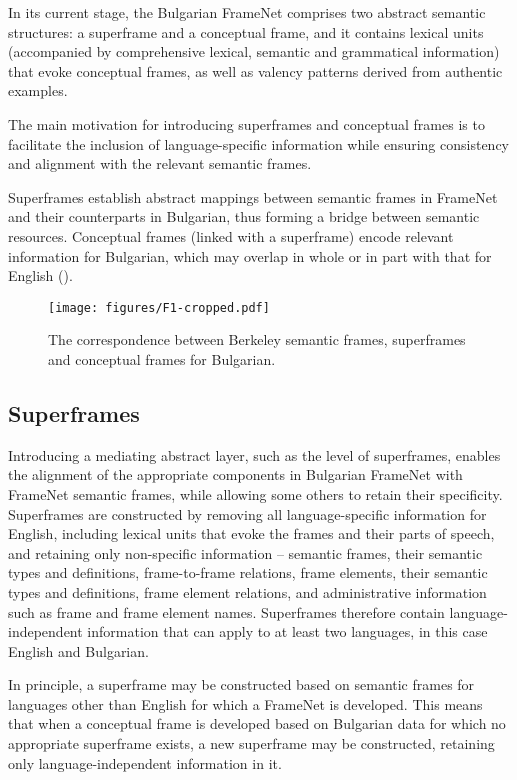 \documentclass[output=paper,colorlinks,citecolor=brown]{langscibook}
\begin{document}
In its current stage, the Bulgarian FrameNet comprises two abstract semantic structures: a superframe and a conceptual frame, and it contains lexical units (accompanied by comprehensive lexical, semantic and grammatical information) that evoke conceptual frames, as well as valency patterns derived from authentic examples.

The main motivation for introducing superframes and conceptual frames is to facilitate the inclusion of language-specific information while ensuring consistency and  alignment with the relevant semantic frames.

Superframes establish abstract mappings between semantic frames in FrameNet and their counterparts in Bulgarian, thus forming a bridge between semantic resources. Conceptual frames (linked with a superframe) encode relevant information for Bulgarian, which may overlap in whole or in part with that for English ().
\largerpage
\begin{figure}
 \texttt{[image: figures/F1-cropped.pdf]}
 \caption{The correspondence between Berkeley semantic frames, superframes and conceptual frames for Bulgarian.}
  \label{fig:frames}
\end{figure}

\subsection{Superframes}  
  

Introducing a mediating abstract layer, such as the level of superframes, enables the alignment of the appropriate components in Bulgarian FrameNet with FrameNet semantic frames, while allowing some others to retain their specificity. Superframes are constructed by removing all language-specific information for English, including lexical units that evoke the frames and their parts of speech, and retaining only non-specific information -- semantic frames, their semantic types and definitions, frame-to-frame relations, frame elements, their semantic types and definitions, frame element relations, and administrative information such as frame and frame element names. Superframes therefore contain language-independent information that can apply to at least two languages, in this case English and Bulgarian.


In principle, a superframe may be constructed based on semantic frames for languages other than English for which a FrameNet is developed. This means that when a conceptual frame is developed based on Bulgarian data for which no appropriate  superframe exists, a new superframe may be constructed, retaining only language-independent information in it.
\end{document}

